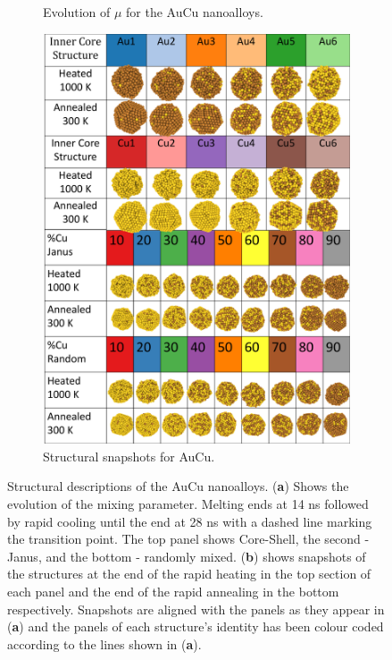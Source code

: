 \begin{figure}
\begin{subfigure}{0.39\textwidth}
    \caption{Evolution of $\mu$ for the AuCu nanoalloys.}
    \label{fig:AuCuMix}
\end{subfigure}
\begin{subfigure}{0.56\textwidth}
    \includegraphics[width=\linewidth]{figures/MD/Alloys/AuCu_Struts.pdf}
    \caption{Structural snapshots for AuCu.}
    \label{fig:AuCu_Struts}
\end{subfigure}
    \caption{Structural descriptions of the AuCu nanoalloys. (\textbf{a}) Shows the evolution of the mixing parameter. Melting ends at 14 ns followed by rapid cooling until the end at 28 ns with a dashed line marking the transition point. The top panel shows Core-Shell, the second - Janus, and the bottom - randomly mixed. (\textbf{b}) shows snapshots of the structures at the end of the rapid heating in the top section of each panel and the end of the rapid annealing in the bottom respectively. Snapshots are aligned with the panels as they appear in (\textbf{a}) and the panels of each structure's identity has been colour coded according to the lines shown in (\textbf{a}).}
    \label{fig:AuCu_NA}
\end{figure}



